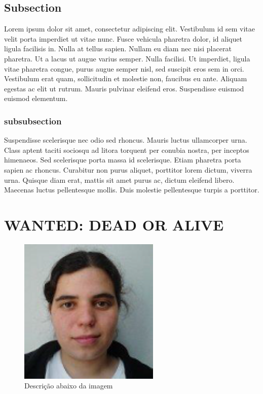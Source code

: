 \documentclass[11pt, a4paper, oneside]{article}
\begin{document}
\subsection{Subsection}

Lorem ipsum dolor sit amet, consectetur adipiscing elit. Vestibulum id sem vitae velit porta imperdiet ut vitae nunc. Fusce vehicula pharetra dolor, id aliquet ligula facilisis in. Nulla at tellus sapien. Nullam eu diam nec nisi placerat pharetra. Ut a lacus ut augue varius semper. Nulla facilisi. Ut imperdiet, ligula vitae pharetra congue, purus augue semper nisl, sed suscipit eros sem in orci. Vestibulum erat quam, sollicitudin et molestie non, faucibus eu ante. Aliquam egestas ac elit ut rutrum. Mauris pulvinar eleifend eros. Suspendisse euismod euismod elementum.

\subsubsection{subsubsection}

Suspendisse scelerisque nec odio sed rhoncus. Mauris luctus ullamcorper urna. Class aptent taciti sociosqu ad litora torquent per conubia nostra, per inceptos himenaeos. Sed scelerisque porta massa id scelerisque. Etiam pharetra porta sapien ac rhoncus. Curabitur non purus aliquet, porttitor lorem dictum, viverra urna. Quisque diam erat, mattis sit amet purus ac, dictum eleifend libero. Maecenas luctus pellentesque mollis. Duis molestie pellentesque turpis a porttitor.

\newpage
\section{WANTED: DEAD OR ALIVE}
\begin{figure}[h!]
  \centering
    \includegraphics[width=0.6\textwidth]{107}
  \caption[Descrição no titulo]{Descrição abaixo da imagem}
\end{figure}
\newpage
\end{document}

